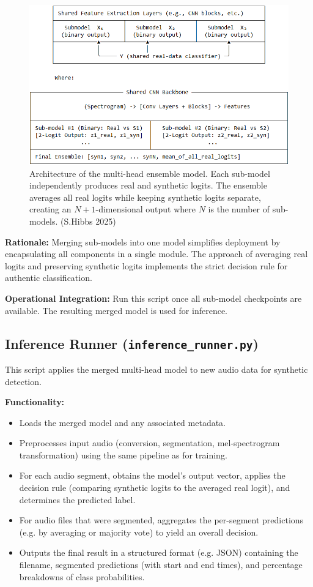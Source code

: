 \documentclass[conference]{IEEEtran}  %
\begin{document}
\begin{figure}[ht]
    \centering
    \includegraphics[width=0.7\linewidth]{figures/multihead_model_architecture.png}
    \caption{Architecture of the multi-head ensemble model. Each sub-model independently produces real and synthetic logits. The ensemble averages all real logits while keeping synthetic logits separate, creating an \(N+1\)-dimensional output where \(N\) is the number of sub-models. (S.Hibbs 2025)}
    \label{fig:multihead_architecture}
\end{figure}

\textbf{Rationale:} Merging sub-models into one model simplifies deployment by encapsulating all components in a single module. The approach of averaging real logits and preserving synthetic logits implements the strict decision rule for authentic classification.

\textbf{Operational Integration:} Run this script once all sub-model checkpoints are available. The resulting merged model is used for inference.

\subsection{Inference Runner (\texttt{inference\_runner.py})}
This script applies the merged multi-head model to new audio data for synthetic detection.

\textbf{Functionality:}
\begin{itemize}
    \item Loads the merged model and any associated metadata.
    \item Preprocesses input audio (conversion, segmentation, mel-spectrogram transformation) using the same pipeline as for training.
    \item For each audio segment, obtains the model’s output vector, applies the decision rule (comparing synthetic logits to the averaged real logit), and determines the predicted label.
    \item For audio files that were segmented, aggregates the per-segment predictions (e.g. by averaging or majority vote) to yield an overall decision.
    \item Outputs the final result in a structured format (e.g. JSON) containing the filename, segmented predictions (with start and end times), and percentage breakdowns of class probabilities.
\end{itemize}
\end{document}
